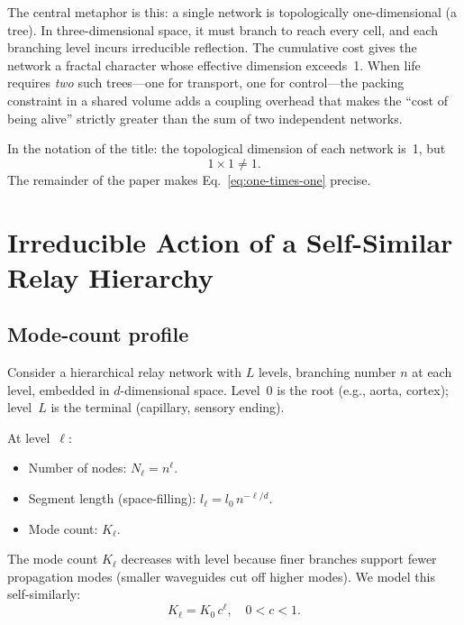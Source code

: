 \documentclass[aps,pre,twocolumn,superscriptaddress,longbibliography]{revtex4-2}
\begin{document}
The central metaphor is this:
a single network is topologically one-dimensional (a tree).
In three-dimensional space, it must branch to reach every
cell, and each branching level incurs irreducible reflection.
The cumulative cost gives the network a fractal character
whose effective dimension exceeds~1.
When life requires \emph{two} such trees---one for transport,
one for control---the packing constraint in a shared volume
adds a coupling overhead that makes the ``cost of being alive''
strictly greater than the sum of two independent networks.

In the notation of the title: the topological dimension of
each network is~1, but
\begin{equation}
  1 \times 1 \neq 1.
  \label{eq:one-times-one}
\end{equation}
The remainder of the paper makes Eq.~\eqref{eq:one-times-one}
precise.


\section{Irreducible Action of a Self-Similar Relay Hierarchy}
\label{sec:acut-fractal}

\subsection{Mode-count profile}

Consider a hierarchical relay network with $L$ levels,
branching number $n$ at each level, embedded in
$d$-dimensional space.
Level~0 is the root (e.g., aorta, cortex);
level~$L$ is the terminal (capillary, sensory ending).

At level~$\ell$:
\begin{itemize}
  \item Number of nodes: $N_\ell = n^\ell$.
  \item Segment length (space-filling):
    $l_\ell = l_0 \, n^{-\ell/d}$.
  \item Mode count: $K_\ell$.
\end{itemize}

The mode count $K_\ell$ decreases with level because
finer branches support fewer propagation modes (smaller
waveguides cut off higher modes).
We model this self-similarly:
\begin{equation}
  K_\ell = K_0 \, c^\ell, \quad 0 < c < 1.
  \label{eq:mode-profile}
\end{equation}
\end{document}
